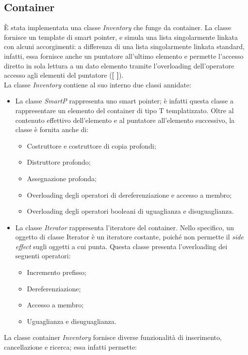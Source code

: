 \subsection{Container}
È stata implementata una classe \textit{Inventory} che funge da container. La classe fornisce un template di smart pointer, e simula una lista singolarmente linkata con alcuni accorgimenti: a differenza di una lista singolarmente linkata standard, infatti, essa fornisce anche un puntatore all'ultimo elemento e permette l'accesso diretto in sola lettura a un dato elemento tramite l'overloading dell'operatore accesso agli elementi del puntatore (\textbf{[ ]}). \\
La classe \textit{Inventory} contiene al suo interno due classi annidate:
\begin{itemize}
  \item La classe \textit{SmartP} rappresenta uno smart pointer; è infatti questa classe a rappresentare un elemento del container di tipo T templatizzato. Oltre al contenuto effettivo dell'elemento e al puntatore all'elemento successivo, la classe è fornita anche di:
  \begin{itemize}
    \item Costruttore e costruttore di copia profondi;
    \item Distruttore profondo;
    \item Assegnazione profonda;
    \item Overloading degli operatori di dereferenziazione e accesso a membro;
    \item Overloading degli operatori booleani di uguaglianza e disuguaglianza.
  \end{itemize}
  \item La classe \textit{Iterator} rappresenta l'iteratore del container. Nello specifico, un oggetto di classe Iterator è un iteratore costante, poiché non permette il \textit{side effect} sugli oggetti a cui punta. Questa classe presenta l'overloading dei seguenti operatori:
  \begin{itemize}
    \item Incremento prefisso;
    \item Dereferenziazione;
    \item Accesso a membro;
    \item Uguaglianza e disuguaglianza.
  \end{itemize}
\end{itemize}
La classe container \textit{Inventory} fornisce diverse funzionalità di inserimento, cancellazione e ricerca; essa infatti permette:
